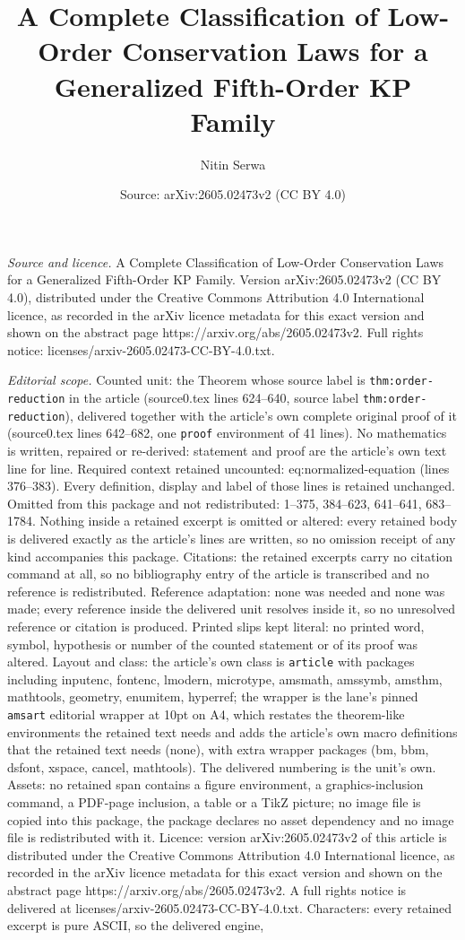 \documentclass[10pt,a4paper]{amsart}
\title[A Complete Classification of Low-Order Conservation Laws for]{A Complete Classification of Low-Order Conservation Laws for a Generalized Fifth-Order KP Family}
\author{Nitin Serwa}
\date{Source: arXiv:2605.02473v2 (CC BY 4.0)}
\begin{document}
\maketitle

\noindent\emph{Source and licence.} A Complete Classification of Low-Order Conservation Laws for a Generalized Fifth-Order KP Family. Version arXiv:2605.02473v2 (CC BY 4.0), distributed under the Creative Commons Attribution 4.0 International licence, as recorded in the arXiv licence metadata for this exact version and shown on the abstract page https://arxiv.org/abs/2605.02473v2. Full rights notice: licenses/arxiv-2605.02473-CC-BY-4.0.txt.\par\smallskip

\noindent\textit{Editorial scope.} Counted unit: the Theorem whose source label is \texttt{thm:order-reduction} in the article (source0.tex lines 624--640, source label \texttt{thm:order-reduction}), delivered together with the article's own complete original proof of it (source0.tex lines 642--682, one \texttt{proof} environment of 41 lines). No mathematics is written, repaired or re-derived: statement and proof are the article's own text line for line. Required context retained uncounted: eq:normalized-equation (lines 376--383). Every definition, display and label of those lines is retained unchanged. Omitted from this package and not redistributed: 1--375, 384--623, 641--641, 683--1784. Nothing inside a retained excerpt is omitted or altered: every retained body is delivered exactly as the article's lines are written, so no omission receipt of any kind accompanies this package. Citations: the retained excerpts carry no citation command at all, so no bibliography entry of the article is transcribed and no reference is redistributed. Reference adaptation: none was needed and none was made; every reference inside the delivered unit resolves inside it, so no unresolved reference or citation is produced. Printed slips kept literal: no printed word, symbol, hypothesis or number of the counted statement or of its proof was altered. Layout and class: the article's own class is \texttt{article} with packages including inputenc, fontenc, lmodern, microtype, amsmath, amssymb, amsthm, mathtools, geometry, enumitem, hyperref; the wrapper is the lane's pinned \texttt{amsart} editorial wrapper at 10pt on A4, which restates the theorem-like environments the retained text needs and adds the article's own macro definitions that the retained text needs (none), with extra wrapper packages (bm, bbm, dsfont, xspace, cancel, mathtools). The delivered numbering is the unit's own. Assets: no retained span contains a figure environment, a graphics-inclusion command, a PDF-page inclusion, a table or a TikZ picture; no image file is copied into this package, the package declares no asset dependency and no image file is redistributed with it. Licence: version arXiv:2605.02473v2 of this article is distributed under the Creative Commons Attribution 4.0 International licence, as recorded in the arXiv licence metadata for this exact version and shown on the abstract page https://arxiv.org/abs/2605.02473v2. A full rights notice is delivered at licenses/arxiv-2605.02473-CC-BY-4.0.txt. Characters: every retained excerpt is pure ASCII, so the delivered engine, 
\end{document}
